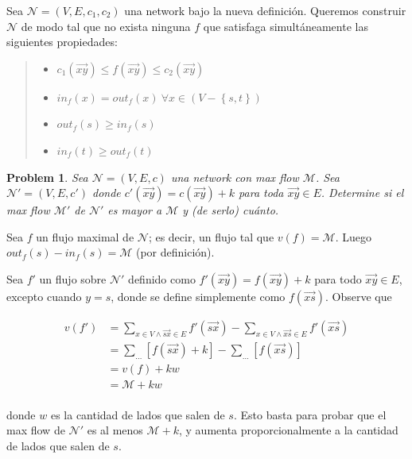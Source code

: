 \documentclass[a4paper]{article}
\newtheorem{problem}{Problem}
\newtheorem{problem}{Problem}
\begin{document}
Sea $\mathcal{N} = (V, E, c_1, c_2)$ una network bajo la nueva definición.
Queremos construir $\mathcal{N}$ de modo tal que no exista ninguna $f$ que
satisfaga simultáneamente las siguientes propiedades: 

\begin{quote}
    \begin{itemize}
        \item $c_1(\overrightarrow{xy}) \leq f(\overrightarrow{xy}) \leq c_2(\overrightarrow{xy})$
        \item $in_f(x) = out_f(x) ~ \forall x \in \left( V - \left\{ s, t \right\}  \right) $
        \item $out_f(s) \geq in_f(s) $
        \item $in_f(t) \geq out_f(t) $
    \end{itemize}
\end{quote}

\begin{problem}
    Sea $\mathcal{N} = (V, E, c)$ una network con max flow $\mathcal{M}$. Sea
    $\mathcal{N}' = (V, E, c')$ donde $c'(\overrightarrow{xy}) =
    c(\overrightarrow{xy}) + k$ para toda $\overrightarrow{xy} \in E$. Determine
    si el max flow $\mathcal{M}'$ de $\mathcal{N}'$ es mayor a $\mathcal{M}$ y
    (de serlo) cuánto.
\end{problem}

Sea $f$ un flujo maximal de $\mathcal{N}$; es decir, un flujo tal que $v(f) =
\mathcal{M}$. Luego $out_f(s) - in_f(s) = \mathcal{M}$ (por definición).

Sea $f'$ un flujo sobre $\mathcal{N}'$ definido como $f'(\overrightarrow{xy}) =
f(\overrightarrow{xy}) + k$ para todo $\overrightarrow{xy} \in E$, excepto
cuando $y = s$, donde se define simplemente como $f(\overrightarrow{xs})$. Observe que

\begin{align*}
    v(f') &= \sum_{x \in V \land \overrightarrow{sx} \in E}
    f'(\overrightarrow{sx}) - \sum_{x \in V \land  \overrightarrow{xs} \in E}
    f'(\overrightarrow{xs}) \\ 
    &= \sum_{\ldots} \left[ f(\overrightarrow{sx}) + k \right]  - \sum_{\ldots}
    \left[ f(\overrightarrow{xs})\right]  \\ 
    &= v(f) + kw  \\ 
    &= \mathcal{M} + kw \\ 
\end{align*}

donde $w$ es la cantidad de lados que salen de $s$. 
Esto basta para probar que el max flow de $\mathcal{N}'$ es al menos
$\mathcal{M} + k$, y aumenta proporcionalmente a la cantidad de lados que salen
de $s$.
\end{document}
